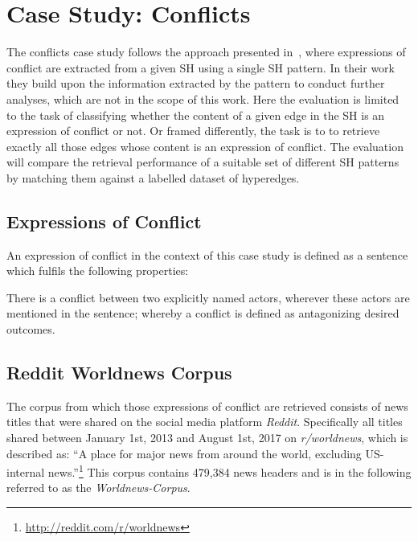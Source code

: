 \documentclass[11pt]{scrreprt}
\let\citef\cite  %
\let\cite\parencite  %
\begin{document}
\section{Case Study: Conflicts}
The conflicts case study follows the approach presented in \citef{menezesSemanticHypergraphs2021}, where expressions of conflict are extracted from a given SH using a single SH pattern. In their work they build upon the information extracted by the pattern to conduct further analyses, which are not in the scope of this work. Here the evaluation is limited to the task of classifying whether the content of a given edge in the SH is an expression of conflict or not. Or framed differently, the task is to to retrieve exactly all those edges whose content is an expression of conflict. The evaluation will compare the retrieval performance of a suitable set of different SH patterns by matching them against a labelled dataset of hyperedges.


\subsection{Expressions of Conflict}
\label{sec:conflict-definition}
An expression of conflict in the context of this case study is defined as a sentence which fulfils the following properties:

\begin{displayquote}
There is a conflict between two explicitly named actors, wherever these actors are mentioned in the sentence; whereby a conflict is defined as antagonizing desired outcomes.
\end{displayquote}

\subsection{Reddit Worldnews Corpus}
The corpus from which those expressions of conflict are retrieved consists of news titles that were shared on the social media platform \textit{Reddit}. Specifically all titles shared between January 1st, 2013 and August 1st, 2017 on \textit{r/worldnews}, which is described as: “A place for major news from around the world, excluding US-internal news.”\footnote{\url{http://reddit.com/r/worldnews}} This corpus contains 479,384 news headers and is in the following referred to as the \textit{Worldnews-Corpus}.
\end{document}
